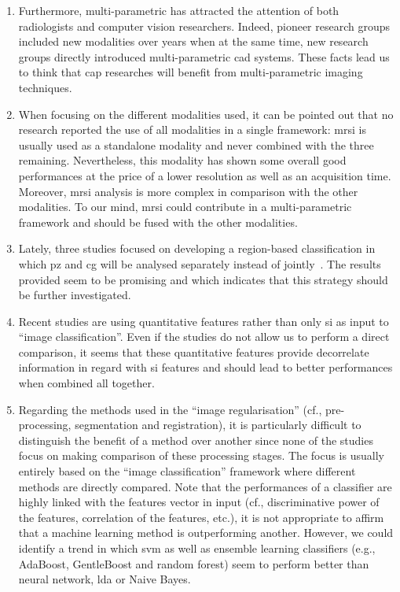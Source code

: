 \begin{enumerate}
\item Furthermore, multi-parametric has attracted the attention of both radiologists and computer vision researchers. Indeed, pioneer research groups included new modalities over years when at the same time, new research groups directly introduced multi-parametric \ac{cad} systems. These facts lead us to think that \ac{cap} researches will benefit from multi-parametric imaging techniques.

\item When focusing on the different modalities used, it can be pointed out that no research reported the use of all modalities in a single framework: \ac{mrsi} is usually used as a standalone modality and never combined with the three remaining. Nevertheless, this modality has shown some overall good performances at the price of a lower resolution as well as an acquisition time. Moreover, \ac{mrsi} analysis is more complex in comparison with the other modalities. To our mind, \ac{mrsi} could contribute in a multi-parametric framework and should be fused with the other modalities.

\item Lately, three studies focused on developing a region-based classification in which \ac{pz} and \ac{cg} will be analysed separately instead of jointly~\cite{Viswanath2012,Litjens2012,Litjens2014}. The results provided seem to be promising and which indicates that this strategy should be further investigated.

\item Recent studies are using quantitative features rather than only \ac{si} as input to ``image classification''. Even if the studies do not allow us to perform a direct comparison, it seems that these quantitative features provide decorrelate information in regard with \ac{si} features and should lead to better performances when combined all together. 

\item Regarding the methods used in the ``image regularisation'' (cf., pre-processing, segmentation and registration), it is particularly difficult to distinguish the benefit of a method over another since none of the studies focus on making comparison of these processing stages. The focus is usually entirely based on the ``image classification'' framework where different methods are directly compared. Note that the performances of a classifier are highly linked with the features vector in input (cf., discriminative power of the features, correlation of the features, etc.), it is not appropriate to affirm that a machine learning method is outperforming another. However, we could identify a trend in which \ac{svm} as well as ensemble learning classifiers (e.g., AdaBoost, GentleBoost and random forest) seem to perform better than neural network, \ac{lda} or Naive Bayes.


\end{enumerate}
